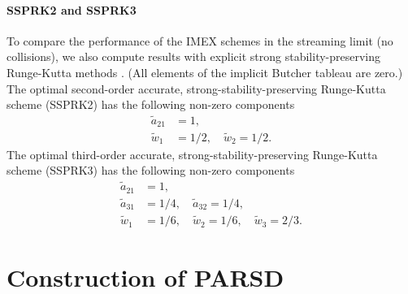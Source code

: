 \paragraph{SSPRK2 and SSPRK3}

To compare the performance of the IMEX schemes in the streaming limit (no collisions), we also compute results with explicit strong stability-preserving Runge-Kutta methods \cite{gottlieb_etal_2001}.  
(All elements of the implicit Butcher tableau are zero.)  
The optimal second-order accurate, strong-stability-preserving Runge-Kutta scheme (SSPRK2) has the following non-zero components
\begin{align}
  \tilde{a}_{21} &= 1, \nonumber \\ 
  \tilde{w}_{1}  &= 1/2, \quad \tilde{w}_{2} = 1/2. \nonumber 
\end{align}
The optimal third-order accurate, strong-stability-preserving Runge-Kutta scheme (SSPRK3) has the following non-zero components
\begin{align}
  \tilde{a}_{21} &= 1, \nonumber \\
  \tilde{a}_{31} &= 1/4, \quad \tilde{a}_{32} = 1/4, \nonumber \\
  \tilde{w}_{1} &= 1/6, \quad \tilde{w}_{2} = 1/6, \quad \tilde{w}_{3} =2/3. \nonumber
\end{align}

\newpage 
\section{Construction of PARSD}

